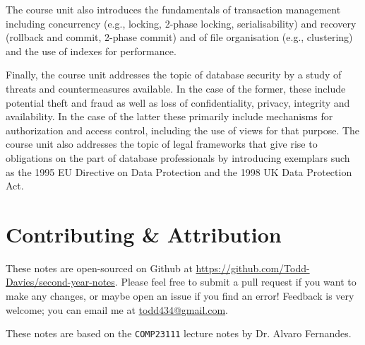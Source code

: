 The course unit also introduces the fundamentals of transaction management
including concurrency (e.g., locking, 2-phase locking, serialisability) and
recovery (rollback and commit, 2-phase commit) and of file organisation (e.g.,
clustering) and the use of indexes for performance.

Finally, the course unit addresses the topic of database security by a study of
threats and countermeasures available. In the case of the former, these include
potential theft and fraud as well as loss of confidentiality, privacy, integrity
and availability. In the case of the latter these primarily include mechanisms
for authorization and access control, including the use of views for that
purpose. The course unit also addresses the topic of legal frameworks that give
rise to obligations on the part of database professionals by introducing
exemplars such as the 1995 EU Directive on Data Protection and the 1998 UK Data
Protection Act.

\section*{Contributing \& Attribution}

These notes are open-sourced on Github at
\url{https://github.com/Todd-Davies/second-year-notes}. Please feel free to
submit a pull request if you want to make any changes, or maybe open an issue
if you find an error! Feedback is very welcome; you can email me at
\href{mailto:todd434@gmail.com}{todd434@gmail.com}.

These notes are based on the \texttt{COMP23111} lecture notes by Dr. Alvaro
Fernandes.
